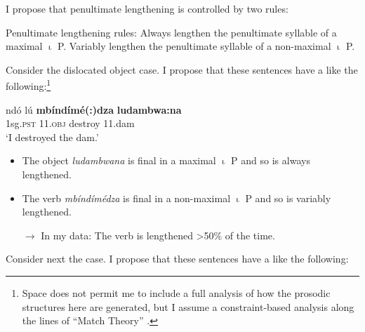\documentclass[output=paper,modfonts,nonflat,hidelinks]{langsci/langscibook}
\begin{document}
\noindent
I propose that penultimate lengthening is controlled by two rules:


\ea \label{ex:kusmer:lengthening_rules} {Penultimate lengthening rules:}
\ea Always lengthen the penultimate syllable of a maximal $\upiota$ P.
\ex Variably lengthen the penultimate syllable of a non-maximal $\upiota$ P.
\z
\z

Consider the dislocated object case. I propose that these sentences have a
 like the following:\footnote{Space does not permit me to
include a full analysis of how the prosodic structures here are generated, but I
assume a constraint-based analysis along the lines of  ``{Match} Theory''
\citep{Selkirk11}.}



\ea \label{ex:kusmer:disloc_pros} 
\gll {\lipm} {\lipn} ndó lú \textbf{mbíndímé(:)dza} {\ripn} \textbf{ludambwa:na} {\ripm}\\
{} {} 1sg.\textsc{pst}  \textsc{11.obj} destroy {} 11.dam {}\\
	\glt  `I destroyed the dam.'
\z

\begin{itemize}
	\item The object \textit{ludambwana} is final in a maximal $\upiota$ P and so is always
		lengthened.
	\item The verb \textit{mbíndímédza} is final in a non-maximal $\upiota$ P and so is
		variably lengthened.
	\item[$\rightarrow$] In my data: The verb is lengthened >50\% of the time.
\end{itemize}

\noindent
Consider next the  case. I propose that these sentences
have a  like the following:

\end{document}
